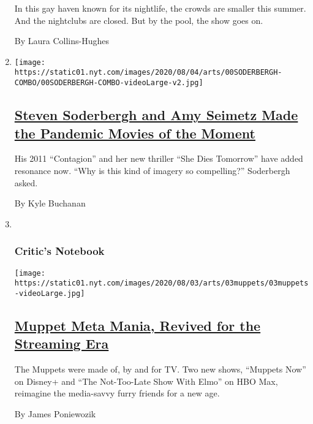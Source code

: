 \begin{enumerate}
  In this gay haven known for its nightlife, the crowds are smaller this
  summer. And the nightclubs are closed. But by the pool, the show goes
  on.

  By Laura Collins-Hughes
\item
  \texttt{[image: https://static01.nyt.com/images/2020/08/04/arts/00SODERBERGH-COMBO/00SODERBERGH-COMBO-videoLarge-v2.jpg]}

  \hypertarget{steven-soderbergh-and-amy-seimetz-made-the-pandemic-movies-of-the-moment}{%
  \subsection{\texorpdfstring{\href{/2020/07/31/movies/steven-soderbergh-amy-seimetz-pandemic.html}{Steven
  Soderbergh and Amy Seimetz Made the Pandemic Movies of the
  Moment}}{Steven Soderbergh and Amy Seimetz Made the Pandemic Movies of the Moment}}\label{steven-soderbergh-and-amy-seimetz-made-the-pandemic-movies-of-the-moment}}

  His 2011 ``Contagion'' and her new thriller ``She Dies Tomorrow'' have
  added resonance now. ``Why is this kind of imagery so compelling?''
  Soderbergh asked.

  By Kyle Buchanan
\item ~
  \hypertarget{critics-notebook}{%
  \subsubsection{Critic's Notebook}\label{critics-notebook}}

  \texttt{[image: https://static01.nyt.com/images/2020/08/03/arts/03muppets/03muppets-videoLarge.jpg]}

  \hypertarget{muppet-meta-mania-revived-for-the-streaming-era}{%
  \subsection{\texorpdfstring{\href{/2020/07/31/arts/television/muppets-now.html}{Muppet
  Meta Mania, Revived for the Streaming
  Era}}{Muppet Meta Mania, Revived for the Streaming Era}}\label{muppet-meta-mania-revived-for-the-streaming-era}}

  The Muppets were made of, by and for TV. Two new shows, ``Muppets
  Now'' on Disney+ and ``The Not-Too-Late Show With Elmo'' on HBO Max,
  reimagine the media-savvy furry friends for a new age.

  By James Poniewozik
\end{enumerate}

